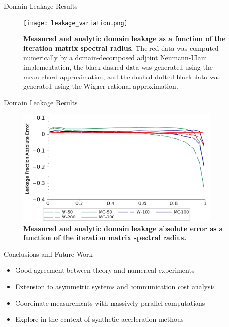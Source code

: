 \documentclass{beamer}
\begin{document}
\begin{frame}{Domain Leakage Results}

  \begin{figure}[t!]
    \begin{center}
      \texttt{[image: leakage\_variation.png]}
    \end{center}
    \caption{\textbf{Measured and analytic domain leakage as a
        function of the iteration matrix spectral radius.} The red
      data was computed numerically by a domain-decomposed adjoint
      Neumann-Ulam implementation, the black dashed data was generated
      using the mean-chord approximation, and the dashed-dotted black
      data was generated using the Wigner rational approximation.}
  \end{figure}

\end{frame}

\begin{frame}{Domain Leakage Results}

  \begin{figure}[ht!]
      \begin{center}
        \includegraphics[width=4.0in,clip]{leakage_error.png}
      \end{center}
      \caption{\textbf{Measured and analytic domain leakage absolute
          error as a function of the iteration matrix spectral radius.}}
  \end{figure}

\end{frame}

\begin{frame}{Conclusions and Future Work}

  \begin{itemize}
  \item Good agreement between theory and numerical experiments
    \bigskip
  \item Extension to asymmetric systems and communication cost analysis
    \bigskip
  \item Coordinate measurements with massively parallel computations
    \bigskip
  \item Explore in the context of synthetic acceleration methods
  \end{itemize}

\end{frame}
\end{document}
